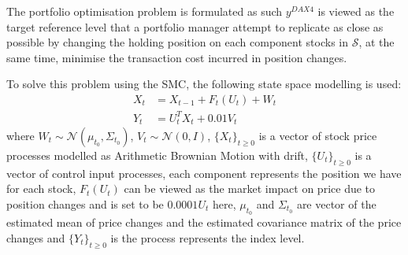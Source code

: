 The portfolio optimisation problem is formulated as such $y^{DAX4}$ is viewed as the target reference level that a portfolio manager attempt to replicate as close as possible by changing the holding position on each component stocks in $\mathcal{S}$, at the same time, minimise the transaction cost incurred in position changes.
 
To solve this problem using the SMC,  the following state space modelling is used:
\begin{align}
  X_t &= X_{t-1} + F_t(U_t) + W_t \\
  Y_t &= U^T_tX_t + 0.01V_t
\end{align}
where $W_t \sim \mathcal{N}(\mu_{t_0}, \Sigma_{t_0})$, $V_t \sim \mathcal{N}(0, I)$, $\{X_t\}_{t \geq 0}$ is a vector of stock price processes modelled as Arithmetic Brownian Motion with drift, $\{U_t\}_{t \geq 0}$ is a vector of control input processes, each component represents the position we have for each stock, $F_t(U_t)$ can be viewed as the market impact on price due to position changes and is set to be $0.0001U_t$ here, $\mu_{t_0}$ and $\Sigma_{t_0}$ are vector of the estimated mean of price changes and the estimated covariance matrix of the price changes and $\{Y_t\}_{t \geq 0}$ is the process represents the index level.

